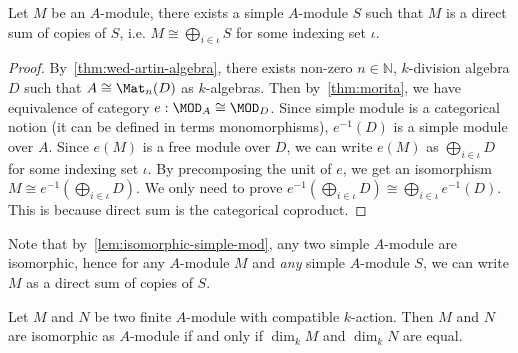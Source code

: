 \begin{lemma}\label{lem:direct-sum-simple-mod}
  Let $M$ be an $A$-module, there exists a simple $A$-module $S$ such that $M$
  is a direct sum of copies of $S$, i.e. $M \cong \bigoplus_{i \in \iota} S$ for
  some indexing set $\iota$. \leanok
\end{lemma}

\begin{proof}
  By~\cref{thm:wed-artin-algebra}, there exists non-zero $n\in\mathbb N$,
  $k$-division algebra $D$ such that $A\cong \Mat_{n}(D)$ as $k$-algebras. Then
  by~\cref{thm:morita}, we have equivalence of category
  $e : \MOD_{A}\cong\MOD_{D}$. Since simple module is a categorical notion (it
  can be defined in terms monomorphisms), $e^{-1}(D)$ is a simple module over
  $A$. Since\label{lem:direct-sum-simple-mod2} $e(M)$ is a free module over $D$, we can write $e(M)$ as
  $\bigoplus_{i\in \iota} D$ for some indexing set $\iota$. By precomposing the
  unit of $e$, we get an isomorphism
  $M \cong e^{-1}\left(\bigoplus_{i\in\iota} D\right)$. We only need to prove
  $e^{-1}\left(\bigoplus_{i\in\iota} D\right)\cong\bigoplus_{i\in\iota}e^{-1}\left(D\right)$.
  This is because direct sum is the categorical coproduct.
\end{proof}

\begin{remark}
  Note that by~\cref{lem:isomorphic-simple-mod}, any two simple $A$-module are
  isomorphic, hence for any $A$-module $M$ and {\em any} simple $A$-module $S$,
  we can write $M$ as a direct sum of copies of $S$.
\end{remark}

\begin{lemma}\label{lem:iso-of-dim-eq}
  Let $M$ and $N$ be two finite $A$-module with compatible $k$-action. Then $M$
  and $N$ are isomorphic as $A$-module if and only if $\dim_{k} M$ and
  $\dim_{k} N$ are equal. \leanok
\end{lemma}

